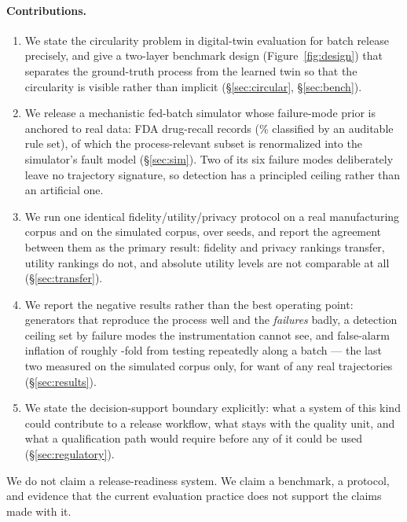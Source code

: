 \documentclass[11pt]{article}
\begin{document}
\paragraph{Contributions.}
\begin{enumerate}[leftmargin=1.4em,itemsep=1pt,topsep=2pt]
\item We state the circularity problem in digital-twin evaluation for batch
release precisely, and give a two-layer benchmark design (Figure~\ref{fig:design})
that separates the ground-truth process from the learned twin so that the
circularity is visible rather than implicit (\S\ref{sec:circular}, \S\ref{sec:bench}).
\item We release a mechanistic fed-batch simulator whose failure-mode prior is
anchored to real data: \recallRecords{} FDA drug-recall records
(\recallCoveragePct{}\% classified by an auditable rule set), of which the
process-relevant subset is renormalized into the simulator's fault model
(\S\ref{sec:sim}). Two of its six failure modes deliberately leave no trajectory
signature, so detection has a principled ceiling rather than an artificial one.
\item We run one identical fidelity/utility/privacy protocol on a real
manufacturing corpus and on the simulated corpus, over \nSeeds{} seeds, and
report the agreement between them as the primary result: fidelity and privacy
rankings transfer, utility rankings do not, and absolute utility levels are not
comparable at all (\S\ref{sec:transfer}).
\item We report the negative results rather than the best operating point:
generators that reproduce the process well and the \emph{failures} badly, a
detection ceiling set by failure modes the instrumentation cannot see, and
false-alarm inflation of roughly \monFAfold{}-fold from testing repeatedly along
a batch --- the last two measured on the simulated corpus only, for want of any
real trajectories (\S\ref{sec:results}).
\item We state the decision-support boundary explicitly: what a system of this
kind could contribute to a release workflow, what stays with the quality unit,
and what a qualification path would require before any of it could be used
(\S\ref{sec:regulatory}).
\end{enumerate}

We do not claim a release-readiness system. We claim a benchmark, a protocol, and
evidence that the current evaluation practice does not support the claims made
with it.
\end{document}
